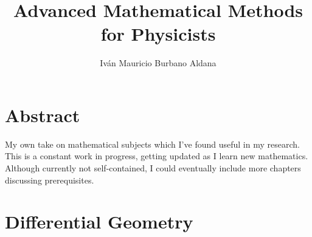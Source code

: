 \documentclass{book}
\title{Advanced Mathematical Methods for Physicists}
\author{Iván Mauricio Burbano Aldana}
\begin{document}
\maketitle

\chapter*{Abstract}

My own take on mathematical subjects which I've found useful in my research. This is a constant work in progress, getting updated as I learn new mathematics. Although currently not self-contained, I could eventually include more chapters discussing prerequisites.

\tableofcontents

\chapter{Differential Geometry}
  
\end{document}
